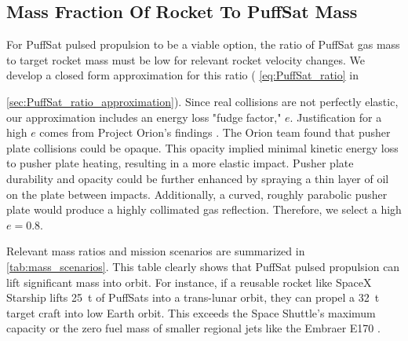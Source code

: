 \documentclass{article}
\begin{document}
\subsection{Mass Fraction Of Rocket To PuffSat Mass}
For PuffSat pulsed propulsion to be a viable option, the ratio of PuffSat gas mass to target rocket mass must be low for relevant rocket velocity changes. We develop a closed form approximation for this ratio ( \autoref{eq:PuffSat_ratio} in {\autoref{sec:PuffSat_ratio_approximation}). Since real collisions are not perfectly elastic, our approximation includes an energy loss "fudge factor," \(e\).  Justification for a high \(e\) comes from Project Orion's findings \cite{orion_reflections}.   The Orion team found that pusher plate collisions could be opaque. This opacity implied minimal kinetic energy loss to pusher plate heating, resulting in a more elastic impact. Pusher plate durability and opacity could be further enhanced by spraying a thin layer of oil on the plate between impacts.   Additionally, a curved, roughly parabolic pusher plate would produce a  highly collimated gas reflection. Therefore, we select a high  \(e=0.8\).   

Relevant mass ratios and mission scenarios are summarized in \autoref{tab:mass_scenarios}. This table clearly shows that PuffSat pulsed propulsion can lift significant mass into orbit. For instance, if a reusable rocket like SpaceX Starship \cite{starship} lifts \SI{25}{\tonne} of PuffSats into a trans-lunar orbit, they can propel a  \SI{32}{\tonne} target craft into low Earth orbit. This exceeds the Space Shuttle's maximum capacity \cite{space_shuttle_program} or the zero fuel mass of smaller regional jets like the Embraer E170 \cite{embraer_e170}.

}
\end{document}
